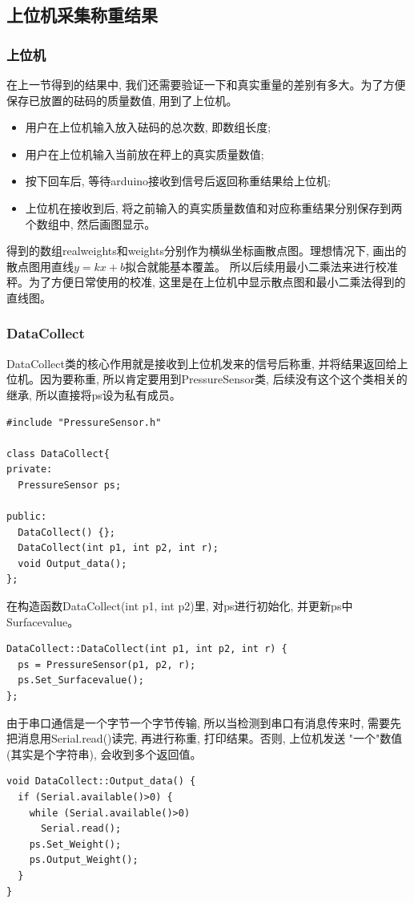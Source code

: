 \documentclass{article}
\begin{document}
\subsection{上位机采集称重结果}
\subsubsection{上位机}
在上一节得到的结果中, 我们还需要验证一下和真实重量的差别有多大。为了方便保存已放置的砝码的质量数值, 用到了上位机。\par
\begin{itemize}
  \item 用户在上位机输入放入砝码的总次数, 即数组长度;
  \item 用户在上位机输入当前放在秤上的真实质量数值;
  \item 按下回车后, 等待arduino接收到信号后返回称重结果给上位机;
  \item 上位机在接收到后, 将之前输入的真实质量数值和对应称重结果分别保存到两个数组中, 然后画图显示。
\end{itemize}



得到的数组realweights和weights分别作为横纵坐标画散点图。理想情况下, 画出的散点图用直线$y=kx+b$拟合就能基本覆盖。
所以后续用最小二乘法来进行校准秤。为了方便日常使用的校准, 这里是在上位机中显示散点图和最小二乘法得到的直线图。

\subsubsection{DataCollect}
DataCollect类的核心作用就是接收到上位机发来的信号后称重, 并将结果返回给上位机。因为要称重, 所以肯定要用到PressureSensor类, 
后续没有这个这个类相关的继承, 所以直接将ps设为私有成员。
\begin{lstlisting}
#include "PressureSensor.h"

class DataCollect{
private:
  PressureSensor ps;

public:
  DataCollect() {};
  DataCollect(int p1, int p2, int r);
  void Output_data();
}; 
\end{lstlisting}

在构造函数DataCollect(int p1, int p2)里, 对ps进行初始化, 并更新ps中Surfacevalue。
\begin{lstlisting}
DataCollect::DataCollect(int p1, int p2, int r) {
  ps = PressureSensor(p1, p2, r);
  ps.Set_Surfacevalue();
};  
\end{lstlisting}

由于串口通信是一个字节一个字节传输, 所以当检测到串口有消息传来时, 需要先把消息用Serial.read()读完, 再进行称重, 打印结果。否则, 上位机发送
"一个"数值(其实是个字符串), 会收到多个返回值。
\begin{lstlisting}
void DataCollect::Output_data() {
  if (Serial.available()>0) {
    while (Serial.available()>0)
      Serial.read();
    ps.Set_Weight();
    ps.Output_Weight();
  }
}
\end{lstlisting}
\end{document}
